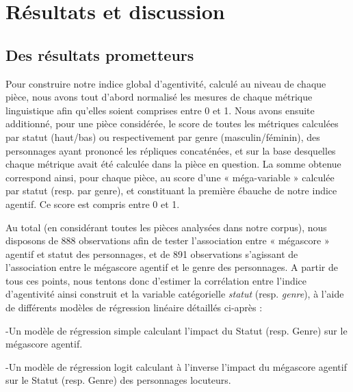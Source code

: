 \part{Résultats et discussion}

\chapter{Des résultats prometteurs}

Pour construire notre indice global d’agentivité, calculé au niveau de chaque pièce, nous avons tout d'abord normalisé les mesures de chaque métrique linguistique afin qu’elles soient comprises entre 0 et 1. Nous avons ensuite additionné, pour une pièce considérée, le score de toutes les métriques calculées par statut (haut/bas) ou respectivement par genre (masculin/féminin), des personnages ayant prononcé les répliques concaténées, et sur la base desquelles chaque métrique avait été calculée dans la pièce en question. La somme obtenue correspond ainsi, pour chaque pièce, au score d’une  « méga-variable » calculée par statut (resp. par genre), et constituant la première ébauche de notre indice agentif. Ce score est compris entre 0 et 1.

Au total (en considérant toutes les pièces analysées dans notre corpus), nous disposons de 888 observations afin de tester l’association entre  « mégascore » agentif et statut des personnages, et de 891 observations s’agissant de l’association entre le mégascore agentif et le genre des personnages. 
A partir de tous ces points, nous tentons donc d’estimer la corrélation entre l'indice d’agentivité ainsi construit et la variable catégorielle \textit{statut} (resp. \textit{genre}), à l'aide de différents modèles de régression linéaire détaillés ci-après :

-Un modèle de régression simple calculant l’impact du Statut (resp. Genre) sur le mégascore agentif.

-Un modèle de régression logit calculant à l’inverse l’impact du mégascore agentif sur le Statut (resp. Genre) des personnages locuteurs.

